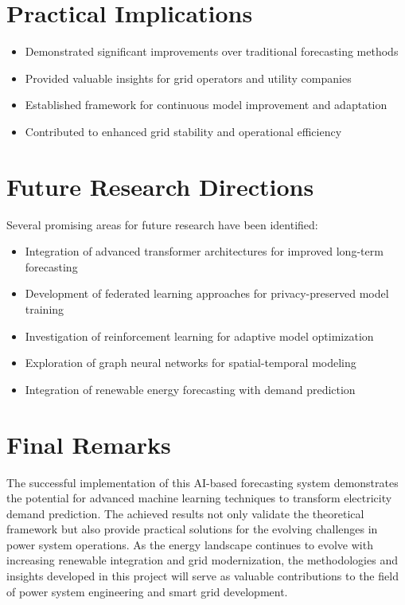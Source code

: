 \documentclass[12pt,a4paper]{report}
\begin{document}
\section{Practical Implications}
\begin{itemize}
\item Demonstrated significant improvements over traditional forecasting methods
\item Provided valuable insights for grid operators and utility companies
\item Established framework for continuous model improvement and adaptation
\item Contributed to enhanced grid stability and operational efficiency
\end{itemize}

\section{Future Research Directions}
Several promising areas for future research have been identified:

\begin{itemize}
\item Integration of advanced transformer architectures for improved long-term forecasting
\item Development of federated learning approaches for privacy-preserved model training
\item Investigation of reinforcement learning for adaptive model optimization
\item Exploration of graph neural networks for spatial-temporal modeling
\item Integration of renewable energy forecasting with demand prediction
\end{itemize}

\section{Final Remarks}
The successful implementation of this AI-based forecasting system demonstrates the potential for advanced machine learning techniques to transform electricity demand prediction. The achieved results not only validate the theoretical framework but also provide practical solutions for the evolving challenges in power system operations. As the energy landscape continues to evolve with increasing renewable integration and grid modernization, the methodologies and insights developed in this project will serve as valuable contributions to the field of power system engineering and smart grid development.
\end{document}
